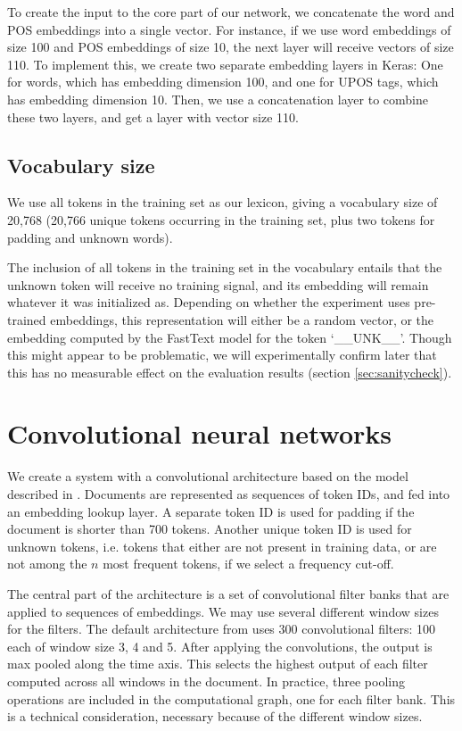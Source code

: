 To create the input to the core part of our network, we concatenate the word
and POS embeddings into a single vector. For instance, if we use word
embeddings of size 100 and POS embeddings of size 10, the next layer will
receive vectors of size 110. To implement this, we create two separate
embedding layers in Keras: One for words, which has embedding dimension 100,
and one for UPOS tags, which has embedding dimension 10. Then, we use a
concatenation layer to combine these two layers, and get a layer with vector
size 110.


\subsection{Vocabulary size} \label{subsec:vocabsize}

We use all tokens in the training set as our lexicon, giving a vocabulary
size of 20,768 (20,766 unique tokens occurring in the training set, plus two
tokens for padding and unknown words).

The inclusion of all tokens in the training set in the vocabulary entails
that the unknown token will receive no training signal, and its embedding
will remain whatever it was initialized as. Depending on whether the
experiment uses pre-trained embeddings, this representation will either be a
random vector, or the embedding computed by the FastText model for the token
`\_\_UNK\_\_'. Though this might appear to be problematic, we will
experimentally confirm later that this has no measurable effect on the
evaluation results (section \ref{sec:sanitycheck}).


\section{Convolutional neural networks}

We create a system with a convolutional architecture based on the model
described in \textcite{kim2014convolutional}. Documents are represented as
sequences of token IDs, and fed into an embedding lookup layer. A separate
token ID is used for padding if the document is shorter than 700 tokens.
Another unique token ID is used for unknown tokens, i.e. tokens that either
are not present in training data, or are not among the $n$ most frequent
tokens, if we select a frequency cut-off.

The central part of the architecture is a set of convolutional filter banks
that are applied to sequences of embeddings. We may use several different
window sizes for the filters. The default architecture from
\textcite{kim2014convolutional} uses 300 convolutional filters: 100 each of
window size 3, 4 and 5. After applying the convolutions, the output is max
pooled along the time axis. This selects the highest output of each filter
computed across all windows in the document. In practice, three pooling
operations are included in the computational graph, one for each filter bank.
This is a technical consideration, necessary because of the different window
sizes.

